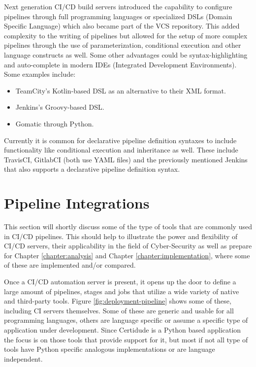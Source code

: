Next generation CI/CD build servers introduced the capability to configure pipelines through full programming languages or specialized DSLs (Domain Specific Language) which also became part of the VCS repository. This added complexity to the writing of pipelines but allowed for the setup of more complex pipelines through the use of parameterization, conditional execution and other language constructs as well.\cite{what-pipeline-as-code} Some other advantages could be syntax-highlighting and auto-complete in modern IDEs (Integrated Development Environments). Some examples include:
\begin{itemize}
    \item TeamCity's Kotlin-based DSL as an alternative to their XML format.\cite{teamcity-dsl}
    \item Jenkins's Groovy-based DSL.\cite{jenkins-dsl}
    \item Gomatic through Python.\cite{gomatic-gpl}
\end{itemize}

Currently it is common for declarative pipeline definition syntaxes to include functionality like conditional execution and inheritance as well. These include TravisCI, GitlabCI (both use YAML files) and the previously mentioned Jenkins that also supports a declarative pipeline definition syntax.\cite{jenkins-declarative}

\pagebreak

\section{Pipeline Integrations}
This section will shortly discuss some of the type of tools that are commonly used in CI/CD pipelines. This should help to illustrate the power and flexibility of CI/CD servers, their applicability in the field of Cyber-Security as well as prepare for Chapter \ref{chapter:analysis} and Chapter \ref{chapter:implementation}, where some of these are implemented and/or compared.

Once a CI/CD automation server is present, it opens up the door to define a large amount of pipelines, stages and jobs that utilize a wide variety of native and third-party tools. Figure \ref{fig:deployment-pipeline} shows some of these, including CI servers themselves. Some of these are generic and usable for all programming languages, others are language specific or assume a specific type of application under development. Since Certidude is a Python based application the focus is on those tools that provide support for it, but most if not all type of tools have Python specific analogous implementations or are language independent.

